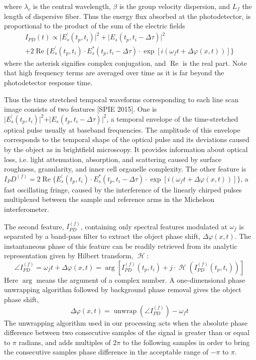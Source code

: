 \documentclass[aps,pra,reprint,superscriptaddress]{revtex4-1}
\DeclareMathOperator{\hilbert}{\mathcal{H}} %
\DeclareMathOperator{\unwrap}{unwrap} %
\begin{document}
where $\lambda_c$ is the central wavelength, $\beta$ is the group velocity dispersion, and $L_f$ the length of dispersive fiber. Thus the energy flux absorbed at the photodetector, is proportional to the product of the sum of the electric fields
\begin{multline}
I_{PD}(t) \propto \lvert E_s^\prime(t_p,t_i) \rvert^2 + \lvert E_s(t_p,t_i-\Delta\tau) \rvert^2\\
+ 2 \operatorname{Re}\lbrace E_s^\prime(t_p,t_i) \cdot E_s^*(t_p,t_i-\Delta\tau) \cdot \exp⁡[i(\omega_f t + \Delta\varphi(x,t))] \rbrace
\end{multline}
where the asterisk signifies complex conjugation, and $\operatorname{Re}$ is the real part. Note that high frequency terms are averaged over time as it is far beyond the photodetector response time. 

Thus the time stretched temporal waveforms corresponding to each line scan image consists of two features [SPIE 2015]. One is $\rvert E_s^\prime(t_p,t_i) \lvert^2 + \rvert E_s(t_p,t_i-\Delta\tau) \lvert^2$, a temporal envelope of the time-stretched optical pulse usually at baseband frequencies. The amplitude of this envelope corresponds to the temporal shape of the optical pulse and its deviations caused by the object as in brightfield microscopy. It provides information about optical loss, i.e. light attenuation, absorption, and scattering caused by surface roughness, granularity, and inner cell organelle complexity. The other feature is $I_PD^{(f)} = 2 \operatorname{Re}\lbrace E_s^\prime(t_p,t_i) \cdot E_s^*(t_p,t_i-\Delta\tau) \cdot \exp⁡[i(\omega_f t + \Delta\varphi(x,t))] \rbrace$, a fast oscillating fringe, caused by the interference of the linearly chirped pulses multiplexed between the sample and reference arms in the Michelson interferometer.

The second feature, $I_{PD}^{(f)}$, containing only spectral features modulated at $\omega_f$ is separated by a band-pass filter to extract the object phase shift, $\Delta\varphi(x,t)$. The instantaneous phase of this feature can be readily retrieved from its analytic representation given by Hilbert transform, $\hilbert$:
\begin{equation}
\angle I_{PD}^{(f)} = \omega_f t + \Delta\varphi(x,t) = \arg⁡[I_{PD}^{(f)} (t_p,t_i ) + j \cdot \hilbert(I_{PD}^{(f)}(t_p,t_i))]
\end{equation}
Here $\arg⁡$ means the argument of a complex number. A one-dimensional phase unwrapping algorithm followed by background phase removal gives the object phase shift, 
\begin{equation}
\Delta\varphi(x,t) = \unwrap(\angle I_{PD}^{(f)}) - \omega_f t
\end{equation}
The unwrapping algorithm used in our processing acts when the absolute phase difference between two consecutive samples of the signal is greater than or equal to $\pi$ radians, and adds multiples of $2\pi$ to the following samples in order to bring the consecutive samples phase difference in the acceptable range of $-\pi$ to $\pi$.
\end{document}
